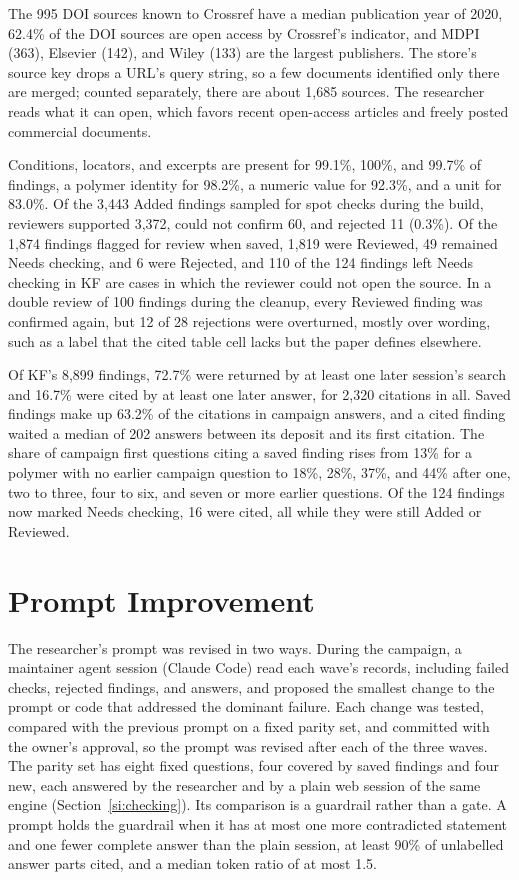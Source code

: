 \documentclass[journal=mamobx,manuscript=suppinfo]{achemso}
\begin{document}
The 995 DOI sources known to Crossref have a median publication year of 2020, 62.4\% of the DOI sources are open access by Crossref's indicator, and MDPI (363), Elsevier (142), and Wiley (133) are the largest publishers.
The store's source key drops a URL's query string, so a few documents identified only there are merged; counted separately, there are about 1,685 sources.
The researcher reads what it can open, which favors recent open-access articles and freely posted commercial documents.

Conditions, locators, and excerpts are present for 99.1\%, 100\%, and 99.7\% of findings, a polymer identity for 98.2\%, a numeric value for 92.3\%, and a unit for 83.0\%.
Of the 3,443 Added findings sampled for spot checks during the build, reviewers supported 3,372, could not confirm 60, and rejected 11 (0.3\%).
Of the 1,874 findings flagged for review when saved, 1,819 were Reviewed, 49 remained Needs checking, and 6 were Rejected, and 110 of the 124 findings left Needs checking in KF are cases in which the reviewer could not open the source.
In a double review of 100 findings during the cleanup, every Reviewed finding was confirmed again, but 12 of 28 rejections were overturned, mostly over wording, such as a label that the cited table cell lacks but the paper defines elsewhere.

Of KF's 8,899 findings, 72.7\% were returned by at least one later session's search and 16.7\% were cited by at least one later answer, for 2,320 citations in all.
Saved findings make up 63.2\% of the citations in campaign answers, and a cited finding waited a median of 202 answers between its deposit and its first citation.
The share of campaign first questions citing a saved finding rises from 13\% for a polymer with no earlier campaign question to 18\%, 28\%, 37\%, and 44\% after one, two to three, four to six, and seven or more earlier questions.
Of the 124 findings now marked Needs checking, 16 were cited, all while they were still Added or Reviewed.

\section{Prompt Improvement}
\label{si:improve}

The researcher's prompt was revised in two ways.
During the campaign, a maintainer agent session (Claude Code) read each wave's records, including failed checks, rejected findings, and answers, and proposed the smallest change to the prompt or code that addressed the dominant failure.
Each change was tested, compared with the previous prompt on a fixed parity set, and committed with the owner's approval, so the prompt was revised after each of the three waves.
The parity set has eight fixed questions, four covered by saved findings and four new, each answered by the researcher and by a plain web session of the same engine (Section~\ref{si:checking}).
Its comparison is a guardrail rather than a gate.
A prompt holds the guardrail when it has at most one more contradicted statement and one fewer complete answer than the plain session, at least 90\% of unlabelled answer parts cited, and a median token ratio of at most 1.5.
\end{document}
